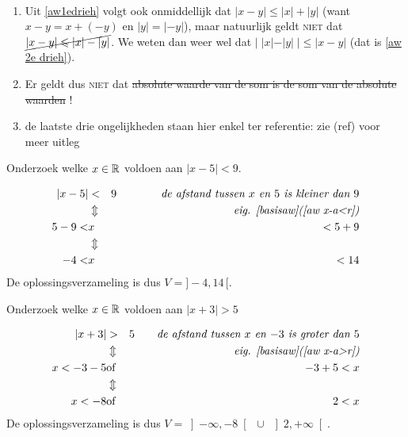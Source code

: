 \documentclass{ximera}
\begin{document}
\begin{remark}\ 
	\begin{enumerate}
		\item Uit \ref{aw1edrieh} volgt ook onmiddellijk dat $|x-y| \leq |x|+|y|$ (want $x-y=x+(-y)$ en $|y|=|-y|$), maar natuurlijk geldt \textsc{niet} dat $\cancel{|x-y| \leq |x| - |y|}$. We weten dan weer wel dat $|\;|x|-|y|\;|\leq|x-y|$ (dat is \ref{aw 2e drieh}).
		\item Er geldt dus \textsc{niet} dat \sout{absolute waarde van de som is de som van de absolute waarden} !
		\item de laatste drie ongelijkheden staan hier enkel ter referentie: zie (ref) voor meer uitleg
	\end{enumerate}
\end{remark}

\begin{problem} Onderzoek welke $x\in \R$ voldoen aan $|x-5|<9.$
		\begin{expandable}
		\begin{oplossing} 
			\begin{eqnarray*}
				|x-5|&<&9 \qquad\qquad \textit{de afstand tussen $x$ en $5$ is kleiner dan $9$}\\
				&\Updownarrow &\textit{eig. \ref{basisaw}(\ref{aw x-a<r})}\\
				5-9<&x&<5+9\\
				&\Updownarrow &\\
				-4<&x&<14
			\end{eqnarray*}
			De oplossingsverzameling is dus $V=]-4,14\,[.$
		\end{oplossing}
		\end{expandable}
	\end{problem}
\begin{problem}	Onderzoek welke $x\in \R$ voldoen aan $|x+3|>5$
		\begin{expandable}
		\begin{oplossing} 
			\begin{eqnarray*}
				|x+3|&>&5 \qquad \textit{de afstand tussen $x$ en $-3$ is groter dan $5$}\\
				&\Updownarrow &\textit{eig. \ref{basisaw}(\ref{aw x-a>r})}
				\\x<-3-5&\mbox{of}&-3+5<x\\
				&\Updownarrow &\\
				x<-8&\mbox{of}&2<x
			\end{eqnarray*}
			De oplossingsverzameling is dus $V=\left]-\infty,-8\right[
			\;\cup\;\left]2, +\infty\right[.$
		\end{oplossing}
		\end{expandable}

\end{problem}
\end{document}
